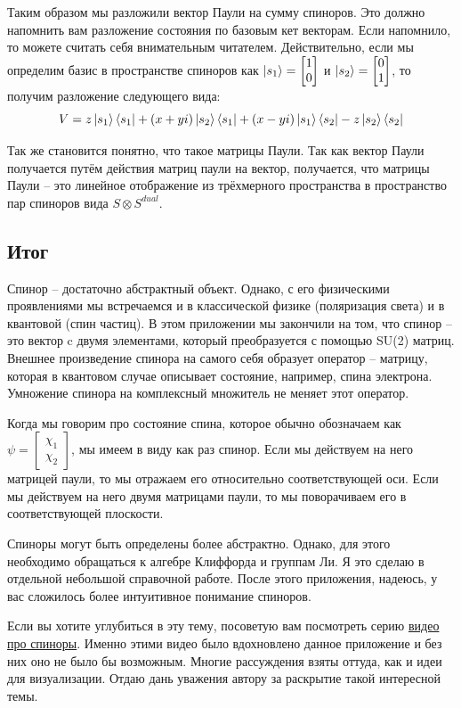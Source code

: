 Таким образом мы разложили вектор Паули на сумму спиноров. Это должно напомнить вам разложение состояния по базовым кет векторам. Если напомнило, то можете считать себя внимательным читателем. Действительно, если мы определим базис в пространстве спиноров как $\ket{s_1} = \begin{bmatrix} 1 \\ 0 \end{bmatrix}$ и $\ket{s_2} = \begin{bmatrix} 0 \\ 1 \end{bmatrix}$, то получим разложение следующего вида:
\[
V = z \ket{s_1}\bra{s_1} + (x + yi)\ket{s_2}\bra{s_1} + (x-yi)\ket{s_1}\bra{s_2} - z \ket{s_2}\bra{s_2}
\]

Так же становится понятно, что такое матрицы Паули. Так как вектор Паули получается путём действия матриц паули на вектор, получается, что матрицы Паули -- это линейное отображение из трёхмерного пространства в пространство пар спиноров вида $S \otimes S^{dual}$.
\subsection{Итог}

Спинор -- достаточно абстрактный объект. Однако, с его физическими проявлениями мы встречаемся и в классической физике (поляризация света) и в квантовой (спин частиц). В этом приложении мы закончили на том, что спинор -- это вектор c двумя элементами, который преобразуется с помощью SU(2) матриц. Внешнее произведение спинора на самого себя образует оператор -- матрицу, которая в квантовом случае описывает состояние, например, спина электрона. Умножение спинора на комплексный множитель не меняет этот оператор.

Когда мы говорим про состояние спина, которое обычно обозначаем как $\psi = \begin{bmatrix} \chi_1 \\ \chi_2 \end{bmatrix}$, мы имеем в виду как раз спинор. Если мы действуем на него матрицей паули, то мы отражаем его относительно соответствующей оси. Если мы действуем на него двумя матрицами паули, то мы поворачиваем его в соответствующей плоскости.

Спиноры могут быть определены более абстрактно. Однако, для этого необходимо обращаться к алгебре Клиффорда и группам Ли. Я это сделаю в отдельной небольшой справочной работе. После этого приложения, надеюсь, у вас сложилось более интуитивное понимание спиноров.

Если вы хотите углубиться в эту тему, посоветую вам посмотреть серию \href{https://www.youtube.com/watch?v=j5soqexrwqY&list=PLJHszsWbB6hoOo_wMb0b6T44KM_ABZtBs&ab_channel=eigenchris}{видео про спиноры}. Именно этими видео было вдохновлено данное приложение и без них оно не было бы возможным. Многие рассуждения взяты оттуда, как и идеи для визуализации. Отдаю дань уважения автору за раскрытие такой интересной темы.
